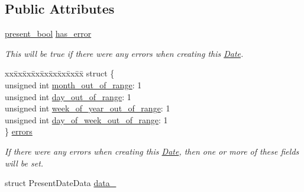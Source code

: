 \subsection*{Public Attributes}
\begin{DoxyCompactItemize}
\item 
\hyperlink{types_8h_a1c24e2cdd988b886e889080ded176ae0}{present\-\_\-bool} \hyperlink{structDate_a4f417d9dd4cd9fd081aff88f9b13931b}{has\-\_\-error}
\begin{DoxyCompactList}\small\item\em This will be true if there were any errors when creating this \hyperlink{structDate}{Date}. \end{DoxyCompactList}\item 
\begin{tabbing}
xx\=xx\=xx\=xx\=xx\=xx\=xx\=xx\=xx\=\kill
struct \{\\
\>unsigned int \hyperlink{structDate_a29e199da53dd2c946b41ee97dbafd2cb}{month\_out\_of\_range}: 1\\
\>unsigned int \hyperlink{structDate_a75853bff950be7a8c71017f35e7b0003}{day\_out\_of\_range}: 1\\
\>unsigned int \hyperlink{structDate_a9e29181d3d839953ee7bae10aa45bf2d}{week\_of\_year\_out\_of\_range}: 1\\
\>unsigned int \hyperlink{structDate_a5dc47ea0e7d16cc6c95321c6b8bba51b}{day\_of\_week\_out\_of\_range}: 1\\
\} \hyperlink{structDate_a69b79f56137adf67014f4009f0047c79}{errors}\\

\end{tabbing}\begin{DoxyCompactList}\small\item\em If there were any errors when creating this \hyperlink{structDate}{Date}, then one or more of these fields will be set. \end{DoxyCompactList}\item 
struct Present\-Date\-Data \hyperlink{structDate_a15a7ce699435bf3c9c60bfff5e1806de}{data\-\_\-}
\end{DoxyCompactItemize}
